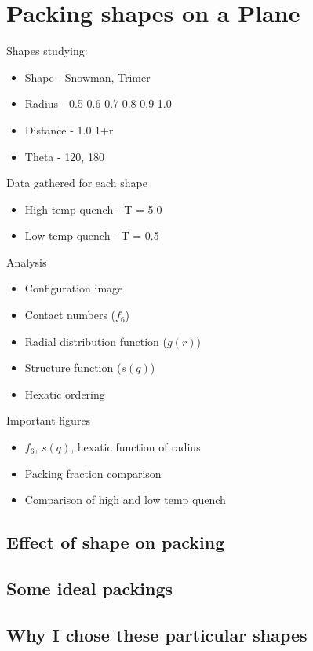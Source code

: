 \chapter{Packing shapes on a Plane}

Shapes studying:
\begin{itemize}
    \item Shape - Snowman, Trimer
    \item Radius - 0.5 0.6 0.7 0.8 0.9 1.0
    \item Distance - 1.0 1+r
    \item Theta - 120, 180
\end{itemize}

Data gathered for each shape
\begin{itemize}
    \item High temp quench - T = 5.0
    \item Low temp quench - T = 0.5
\end{itemize}

Analysis
\begin{itemize}
    \item Configuration image
    \item Contact numbers ($f_6$)
    \item Radial distribution function ($g(r)$)
    \item Structure function ($s(q)$)
    \item Hexatic ordering 
\end{itemize}

Important figures
\begin{itemize}
    \item $f_6$, $s(q)$, hexatic function of radius
    \item Packing fraction comparison
    \item Comparison of high and low temp quench
\end{itemize}

\section{Effect of shape on packing}

\section{Some ideal packings}

\section{Why I chose these particular shapes}
